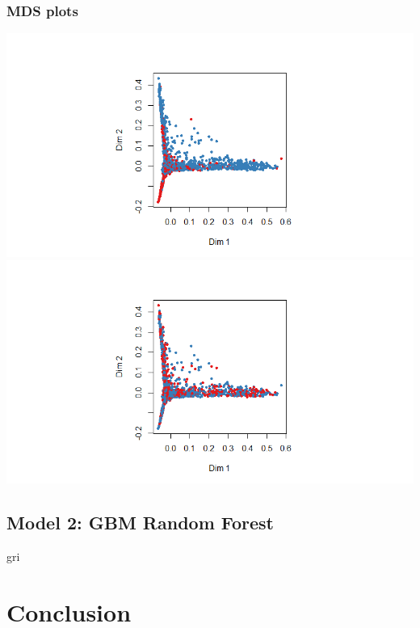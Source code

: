 \documentclass[11pt,preprint, authoryear]{elsarticle}
\let\origfigure\figure
\let\endorigfigure\endfigure
\renewenvironment{figure}[1][2] {
    \expandafter\origfigure\expandafter[H]
} {
    \endorigfigure
}
\numberwithin{equation}{section}
\numberwithin{figure}{section}
\numberwithin{table}{section}
\begin{document}
\hypertarget{mds-plots}{%
\subsubsection{MDS plots}\label{mds-plots}}

\begin{figure}[H]

{\centering \includegraphics[width=1\linewidth,height=0.3\textheight]{Figures/MDS_rf3_train} \includegraphics[width=1\linewidth,height=0.3\textheight]{Figures/MDS_rf3_test} 

}

\caption{\label{MDSrf3} - Training Data (Top), Test Data (Bottom)}\label{fig:MDSrf3}
\end{figure}

\hypertarget{model-2-gbm-random-forest}{%
\subsection{Model 2: GBM Random
Forest}\label{model-2-gbm-random-forest}}

gri

\hypertarget{conclusion}{%
\section{Conclusion}\label{conclusion}}
\end{document}
